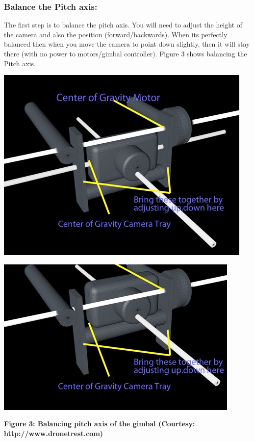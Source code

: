 \documentclass[11pt,a4paper]{article}
\begin{document}
			\subsubsection{Balance the Pitch axis:}
			The first step is to balance the pitch axis. You will need to adjust the height of the camera and also the position (forward/backwards). When its perfectly balanced then when you move the camera to point down slightly, then it will stay there (with no power to motors/gimbal controller). Figure 3 shows balancing the Pitch axis.
			\newline
			\begin{center}
				\includegraphics[scale=1.8]{../Images/balancing_pitch_1.jpg}
			\end{center}
			\begin{center}
				\includegraphics[scale=2.1]{../Images/balancing_pitch_2.jpg}
			\end{center}
			\begin{center}
				\textbf{Figure 3: Balancing pitch axis of the gimbal (Courtesy: http://www.dronetrest.com)}
			\end{center}
			
\end{document}
